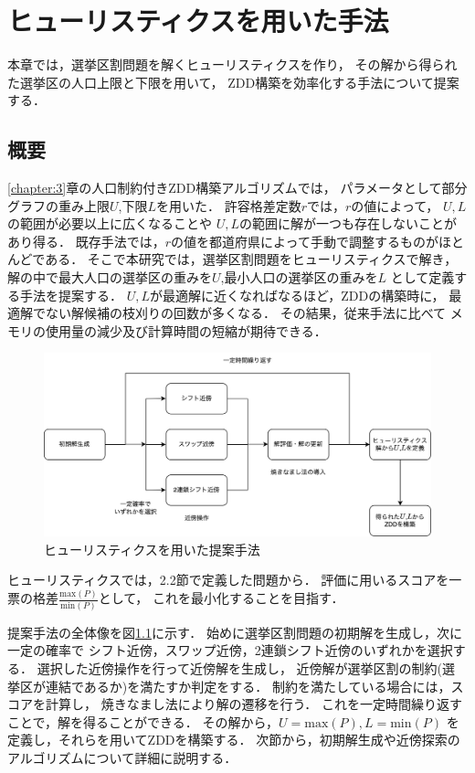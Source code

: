 \chapter{ヒューリスティクスを用いた手法} \label{chapter:4}

本章では，選挙区割問題を解くヒューリスティクスを作り，
その解から得られた選挙区の人口上限と下限を用いて，
ZDD構築を効率化する手法について提案する．

\section{概要}

\ref{chapter:3}章の人口制約付きZDD構築アルゴリズムでは，
パラメータとして部分グラフの重み上限$U$,下限$L$を用いた．
許容格差定数$r$では，$r$の値によって，
$U, L$の範囲が必要以上に広くなることや
$U, L$の範囲に解が一つも存在しないことがあり得る．
既存手法では，$r$の値を都道府県によって手動で調整するものがほとんどである．
そこで本研究では，選挙区割問題をヒューリスティクスで解き，
解の中で最大人口の選挙区の重みを$U$,最小人口の選挙区の重みを$L$
として定義する手法を提案する．
$U, L$が最適解に近くなればなるほど，ZDDの構築時に，
最適解でない解候補の枝刈りの回数が多くなる．
その結果，従来手法に比べて
メモリの使用量の減少及び計算時間の短縮が期待できる．

\begin{figure}[htbp]
  \centering
  \includegraphics[scale=0.39]{img/heuristics.png}
  \caption{ヒューリスティクスを用いた提案手法}
  \label{heuristics}
\end{figure}

ヒューリスティクスでは，2.2節で定義した問題から．
評価に用いるスコアを一票の格差$\frac{\mathrm{max}(P)}{\mathrm{min}(P)}$として，
これを最小化することを目指す．

提案手法の全体像を図\ref{heuristics}に示す．
始めに選挙区割問題の初期解を生成し，次に一定の確率で
シフト近傍，スワップ近傍，2連鎖シフト近傍のいずれかを選択する．
選択した近傍操作を行って近傍解を生成し，
近傍解が選挙区割の制約(選挙区が連結であるか)を満たすか判定をする．
制約を満たしている場合には，スコアを計算し，
焼きなまし法により解の遷移を行う．
これを一定時間繰り返すことで，解を得ることができる．
その解から，$U = \mathrm{max}(P), L = \mathrm{min}(P)$
を定義し，それらを用いてZDDを構築する．
次節から，初期解生成や近傍探索のアルゴリズムについて詳細に説明する．

